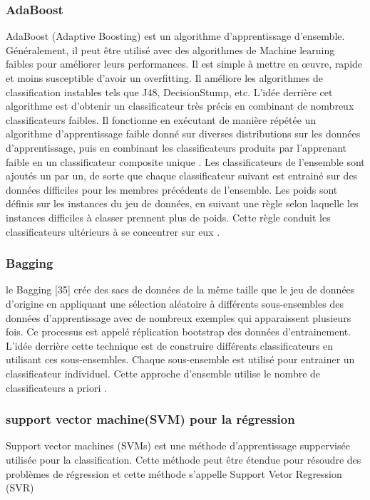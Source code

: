 \subsubsection{AdaBoost}
AdaBoost (Adaptive Boosting) \cite{ML32} est un algorithme d'apprentissage d'ensemble. Généralement, il peut être utilisé avec des algorithmes de Machine learning faibles pour améliorer leurs performances. Il est simple à mettre en œuvre, rapide et moins susceptible d'avoir un overfitting. Il améliore les algorithmes de classification instables tels que J48, DecisionStump, etc. L'idée derrière cet algorithme est d'obtenir un classificateur très précis en combinant de nombreux classificateurs faibles. Il fonctionne en exécutant de manière répétée un algorithme d'apprentissage faible donné sur diverses distributions sur les données d'apprentissage, puis en combinant les classificateurs produits par l'apprenant faible en un classificateur composite unique \cite{ML33}. Les classificateurs de l'ensemble sont ajoutés un par un, de sorte que chaque classificateur suivant est entrainé sur des données difficiles pour les membres précédents de l'ensemble. Les poids sont définis sur les instances du jeu de données, en suivant une règle selon laquelle les instances difficiles à classer prennent plus de poids. Cette règle conduit les classificateurs ultérieurs à se concentrer sur eux \cite{ML34}.

\subsubsection{Bagging}
le Bagging [35] crée des sacs de données de la même taille que le jeu de données d'origine en appliquant une sélection aléatoire à différents sous-ensembles des données d'apprentissage avec de nombreux exemples qui apparaissent plusieurs fois. Ce processus est appelé réplication bootstrap des données d'entrainement. L'idée derrière cette technique est de construire différents classificateurs en utilisant ces sous-ensembles. Chaque sous-ensemble est utilisé pour entrainer un classificateur individuel. Cette approche d'ensemble utilise le nombre de classificateurs a priori \cite{ML35}.

\subsubsection{support vector machine(SVM) pour la régression}
Support vector machines (SVMs) est une méthode d'apprentissage suppervisée utilisée pour la classification. Cette méthode peut être étendue pour résoudre des problèmes de régression et cette méthode s'appelle Support Vetor Regression (SVR)

